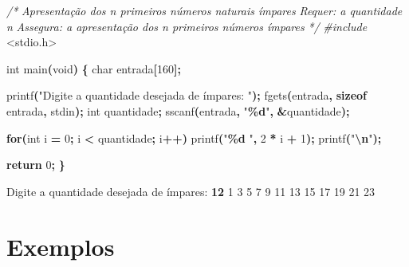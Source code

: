\documentclass[
  11pt,
  a4paper,
]{scrbook}
\newenvironment{Shaded}{\begin{snugshade}}{\end{snugshade}}
\newcommand{\CommentTok}[1]{\textcolor[rgb]{0.56,0.35,0.01}{\textit{#1}}}
\newcommand{\ControlFlowTok}[1]{\textcolor[rgb]{0.13,0.29,0.53}{\textbf{#1}}}
\newcommand{\DataTypeTok}[1]{\textcolor[rgb]{0.13,0.29,0.53}{#1}}
\newcommand{\DecValTok}[1]{\textcolor[rgb]{0.00,0.00,0.81}{#1}}
\newcommand{\ImportTok}[1]{#1}
\newcommand{\KeywordTok}[1]{\textcolor[rgb]{0.13,0.29,0.53}{\textbf{#1}}}
\newcommand{\NormalTok}[1]{#1}
\newcommand{\OperatorTok}[1]{\textcolor[rgb]{0.81,0.36,0.00}{\textbf{#1}}}
\newcommand{\PreprocessorTok}[1]{\textcolor[rgb]{0.56,0.35,0.01}{\textit{#1}}}
\newcommand{\SpecialCharTok}[1]{\textcolor[rgb]{0.81,0.36,0.00}{\textbf{#1}}}
\newcommand{\StringTok}[1]{\textcolor[rgb]{0.31,0.60,0.02}{#1}}
\begin{document}
\begin{Shaded}
\begin{Highlighting}[]
\CommentTok{/*}
\CommentTok{Apresentação dos n primeiros números naturais ímpares}
\CommentTok{Requer: a quantidade n}
\CommentTok{Assegura: a apresentação dos n primeiros números ímpares}
\CommentTok{*/}
\PreprocessorTok{\#include }\ImportTok{\textless{}stdio.h\textgreater{}}

\DataTypeTok{int}\NormalTok{ main}\OperatorTok{(}\DataTypeTok{void}\OperatorTok{)} \OperatorTok{\{}
    \DataTypeTok{char}\NormalTok{ entrada}\OperatorTok{[}\DecValTok{160}\OperatorTok{];}

\NormalTok{    printf}\OperatorTok{(}\StringTok{"Digite a quantidade desejada de ímpares: "}\OperatorTok{);}
\NormalTok{    fgets}\OperatorTok{(}\NormalTok{entrada}\OperatorTok{,} \KeywordTok{sizeof}\NormalTok{ entrada}\OperatorTok{,}\NormalTok{ stdin}\OperatorTok{);}
    \DataTypeTok{int}\NormalTok{ quantidade}\OperatorTok{;}
\NormalTok{    sscanf}\OperatorTok{(}\NormalTok{entrada}\OperatorTok{,} \StringTok{"}\SpecialCharTok{\%d}\StringTok{"}\OperatorTok{,} \OperatorTok{\&}\NormalTok{quantidade}\OperatorTok{);}

    \ControlFlowTok{for}\OperatorTok{(}\DataTypeTok{int}\NormalTok{ i }\OperatorTok{=} \DecValTok{0}\OperatorTok{;}\NormalTok{ i }\OperatorTok{\textless{}}\NormalTok{ quantidade}\OperatorTok{;}\NormalTok{ i}\OperatorTok{++)}
\NormalTok{        printf}\OperatorTok{(}\StringTok{"}\SpecialCharTok{\%d}\StringTok{ "}\OperatorTok{,} \DecValTok{2} \OperatorTok{*}\NormalTok{ i }\OperatorTok{+} \DecValTok{1}\OperatorTok{);}
\NormalTok{    printf}\OperatorTok{(}\StringTok{"}\SpecialCharTok{\textbackslash{}n}\StringTok{"}\OperatorTok{);}

    \ControlFlowTok{return} \DecValTok{0}\OperatorTok{;}
\OperatorTok{\}}
\end{Highlighting}
\end{Shaded}

\begin{Shaded}
\begin{Highlighting}[]
\NormalTok{Digite a quantidade desejada de ímpares: }\KeywordTok{ 12 }
\NormalTok{1 3 5 7 9 11 13 15 17 19 21 23 }
\end{Highlighting}
\end{Shaded}

\section{Exemplos}\label{exemplos-1}
\end{document}
